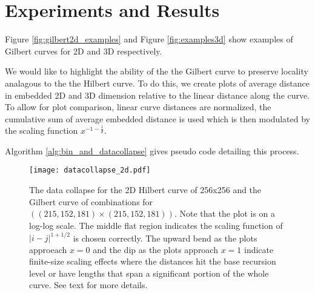 \section{Experiments and Results}

Figure \ref{fig:gilbert2d_examples} and Figure \ref{fig:examples3d} show examples of Gilbert curves for 2D and 3D respectively.

We would like to highlight the ability of the the Gilbert curve to preserve locality analagous to the the Hilbert curve.
To do this, we create plots of average distance in embedded 2D and 3D dimension relative to the linear distance along the curve.
To allow for plot comparison, linear curve distances are normalized, the cumulative sum of average embedded distance is
used which is then modulated by the scaling function $x^{-1-\frac{1}{d}}$.

Algorithm \ref{alg:bin_and_datacollapse} gives pseudo code detailing this process.


\begin{figure}[h]
  \centering
  \label{fig:datacollapse_2d}
  \texttt{[image: datacollapse\_2d.pdf]}
  \caption{ The data collapse for the 2D Hilbert curve of 256x256 and the Gilbert curve of combinations for $((215,152,181) \times (215,152,181))$. 
  Note that the plot is on a log-log scale.
  The middle flat region indicates the scaling function of $|i-j|^{1 + 1/2}$ is chosen correctly.
  The upward bend as the plots approeach $x=0$ and the dip as the plots approach $x=1$ indicate finite-size scaling effects where the distances
  hit the base recursion level or have lengths that span a significant portion of the whole curve.
  See text for more details.
  }
\end{figure}

